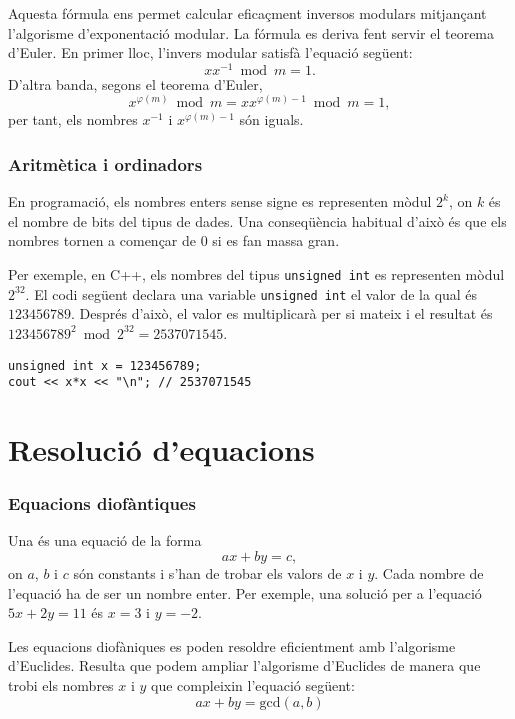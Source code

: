Aquesta fórmula ens permet calcular eficaçment inversos modulars
mitjançant l'algorisme d'exponentació modular. La fórmula es deriva
fent servir el teorema d'Euler. En primer lloc, l'invers modular
satisfà l'equació següent:
\[
x x^{-1} \bmod m = 1.
\]
D'altra banda, segons el teorema d'Euler,
\[
x^{\varphi(m)} \bmod m =  xx^{\varphi(m)-1} \bmod m = 1,
\]
per tant, els nombres $x^{-1}$ i $x^{\varphi(m)-1}$ són iguals.

\subsubsection{Aritmètica i ordinadors}

En programació, els nombres enters sense signe es representen mòdul
$2^k$, on $k$ és el nombre de bits del tipus de dades. Una
conseqüència habitual d'això és que els nombres tornen a començar de 0
si es fan massa gran.

Per exemple, en C++, els nombres del tipus \texttt{unsigned int} es
representen mòdul $2^{32}$. El codi següent declara una variable
\texttt{unsigned int} el valor de la qual és $123456789$. Després
d'això, el valor es multiplicarà per si mateix i el resultat és
$123456789^2 \bmod 2^{32} = 2537071545$.


\begin{lstlisting}
unsigned int x = 123456789;
cout << x*x << "\n"; // 2537071545
\end{lstlisting}


\section{Resolució d'equacions}

\subsubsection*{Equacions diofàntiques}


Una  %
és una equació de la forma
\[ ax + by = c, \]
on $a$, $b$ i $c$ són constants i s'han de trobar els valors de $x$ i
$y$. Cada nombre de l'equació ha de ser un nombre enter. Per exemple,
una solució per a l'equació $5x+2y=11$ és $x=3$ i $y=-2$.


Les equacions diofàniques es poden resoldre eficientment amb
l'algorisme d'Euclides. Resulta que podem ampliar l'algorisme
d'Euclides de manera que trobi els nombres $x$ i $y$ que compleixin
l'equació següent:
\[
ax + by = \textrm{gcd}(a,b)
\]

